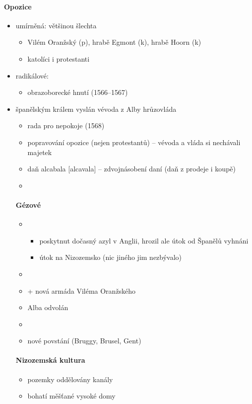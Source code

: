 \paragraph{Opozice}
\begin{itemize}
\item umírněná: většinou šlechta
	\begin{itemize}
	\item Vilém Oranžský (p), hrabě Egmont (k), hrabě Hoorn (k)
	\item katolíci i protestanti
	\end{itemize}
\item radikálové:
	\begin{itemize}
	\item obrazoborecké hnutí (1566--1567)
	\end{itemize}
\item španělským králem vyslán vévoda z Alby \ra hrůzovláda 
\begin{itemize}
\item \ra rada pro nepokoje (1568)
\item popravování opozice (nejen protestantů) -- vévoda a vláda si nechávali majetek
\item daň alcabala [alcavala] -- zdvojnásobení daní (daň z prodeje i koupě)
\item {}
\end{itemize}

\paragraph{Gézové}
\begin{itemize}
\item
	\begin{itemize}
	\item poskytnut dočasný azyl v Anglii, hrozil ale útok od Španělů \ra vyhnáni
	\item[\ra] útok na Nizozemsko (nic jiného jim nezbývalo)
	\end{itemize}
\item {}
\item + nová armáda Viléma Oranžského
\item Alba odvolán
\item {}
\item nové povstání (Bruggy, Brusel, Gent)
\end{itemize}

\paragraph{Nizozemská kultura}
\begin{itemize}
\item pozemky oddělovány kanály
\item bohatí měšťané \ra vysoké domy 
\end{itemize}


\end{itemize}
